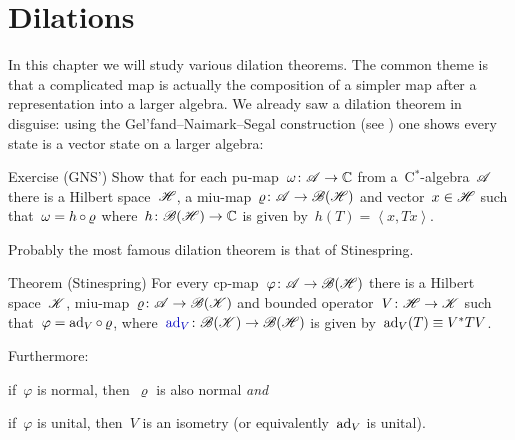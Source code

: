 \documentclass[b]{subfiles}
\begin{document}

\chapter{Dilations}

\begin{parsec}%
\begin{point}%
In this chapter we will study various dilation theorems.
The common theme is that a complicated map
    is actually the composition of a simpler map
    after a representation into a larger algebra.
We already saw a dilation theorem in disguise:
    using the Gel'fand--Naimark--Segal construction (see )
    one shows every state is a vector state on a larger algebra:
\end{point}
\begin{point}{Exercise (GNS')}%
    Show that
    for each pu-map~$\omega\colon \mathscr{A} \to \mathbb{C}$
        from a~C$^*$-algebra~$\mathscr{A}$
    there is a Hilbert space~$\mathscr{H}$,
    a miu-map~$\varrho\colon \mathscr{A} \to \mathscr{B}(\mathscr{H})$
    and vector~$x \in \mathscr{H}$
    such that~$\omega = h \mathop{\circ} \varrho$
    where~$h \colon \mathscr{B}(\mathscr{H}) \to \mathbb{C}$
    is given by~$h(T) = \left<x,Tx\right>$.
\end{point}

\begin{point}%
Probably the most famous dilation theorem is that
of Stinespring\cite[Thm.~1]{stinespring}.
\end{point}

\begin{point}{Theorem (Stinespring)}
    For every cp-map~$\varphi\colon \mathscr{A} \to \mathscr{B} (\mathscr{H})$
    there is a Hilbert space~$\mathscr{K}$,
        miu-map~$\varrho\colon \mathscr{A} \to \mathscr{B}(\mathscr{K})$
        and bounded operator~$V\colon \mathscr{H} \to \mathscr{K}$
        such that~$\varphi = \mathrm{ad}_V \mathop{\circ} \varrho$,
        where~$\Define{\ad_V} \colon \scrB(\scrK) \to \scrB(\scrH)$
        is given by~$\mathrm{ad}_V(T)\equiv V^*TV$.

Furthermore:
\begin{inparaenum}
\item
    if~$\varphi$ is normal, then~$\varrho$ is also normal \emph{and}
\item
    if~$\varphi$ is unital, then~$V$ is an isometry
        (or equivalently~$\mathrm{ad}_V$ is unital).
\end{inparaenum}
\end{point}


\end{parsec}
\end{document}
